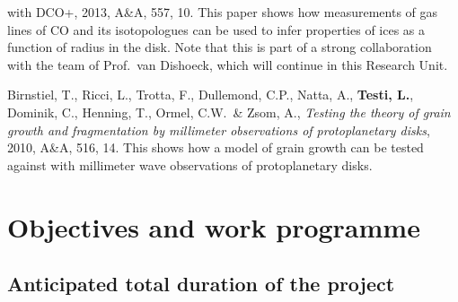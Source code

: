 \documentclass[10pt,fleqn,twoside]{article}
\begin{document}
\begin{literature}
{    with DCO+}, 2013, A\&A, 557, 10. This paper shows how measurements of
  gas lines of CO and its isotopologues can be used to infer properties of
  ices as a function of radius in the disk.  Note that this is part of a
  strong collaboration with the team of Prof.~van Dishoeck, which will
  continue in this Research Unit.
\item Birnstiel, T., Ricci, L., Trotta, F., Dullemond, C.P., Natta, A.,
  {\bf Testi, L.}, Dominik, C., Henning, T., Ormel, C.W.\ \& Zsom, A., {\em
    Testing the theory of grain growth and fragmentation by millimeter
    observations of protoplanetary disks}, 2010, A\&A, 516, 14. This shows
  how a model of grain growth can be tested against with millimeter wave
  observations of protoplanetary disks.
\end{literature}



% 
% 
% 
% 
% 
% 

\section{Objectives and work programme}
\renewcommand{\leftmark}{\sc Objectives and work programme}


\subsection{Anticipated total duration of the project}
\end{document}
